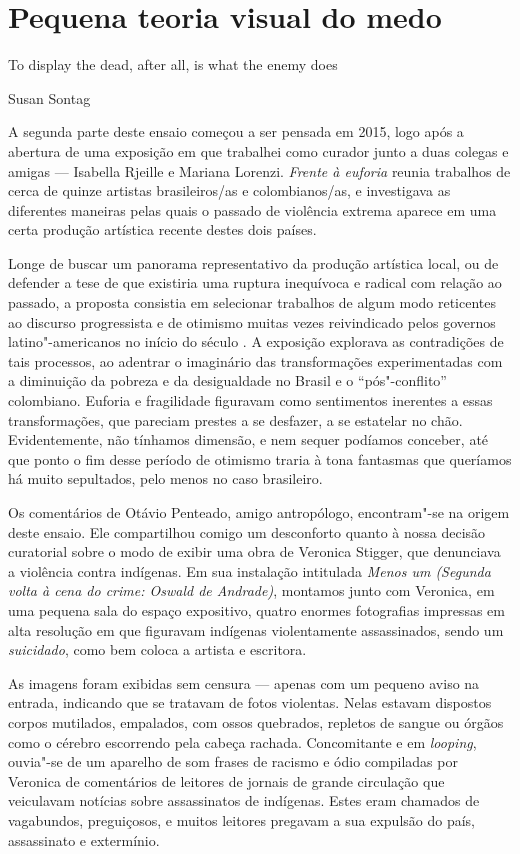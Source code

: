 \pagebreak

\section*{Pequena teoria visual do medo}

\epigraph{To display the dead, after all, is what the enemy does}{Susan Sontag}

A segunda parte deste ensaio começou a ser pensada em 2015, logo após a
abertura de uma exposição em que trabalhei como curador junto a duas
colegas e amigas --- Isabella Rjeille e Mariana Lorenzi. \emph{Frente à
euforia} reunia trabalhos de cerca de quinze artistas brasileiros/as e
colombianos/as, e investigava as diferentes maneiras pelas
quais o passado de violência extrema aparece em uma certa produção artística
recente destes dois países.

Longe de buscar um panorama representativo da produção artística local,
ou de defender a tese de que existiria uma ruptura inequívoca e radical
com relação ao passado, a proposta consistia em selecionar trabalhos de
algum modo reticentes ao discurso progressista e de otimismo muitas
vezes reivindicado pelos governos latino"-americanos no início do século
. A exposição explorava as contradições de tais processos, ao adentrar
o imaginário das transformações experimentadas com a diminuição da
pobreza e da desigualdade no Brasil e o ``pós"-conflito'' colombiano.
Euforia e fragilidade figuravam como sentimentos inerentes a essas
transformações, que pareciam prestes a se desfazer, a se estatelar no
chão. Evidentemente, não tínhamos dimensão, e nem sequer podíamos
conceber, até que ponto o fim desse período de otimismo traria à tona
fantasmas que queríamos há muito sepultados, pelo menos no caso
brasileiro.

Os comentários de Otávio Penteado, amigo antropólogo, encontram"-se na origem deste ensaio. Ele compartilhou comigo um desconforto quanto à nossa decisão
curatorial sobre o modo de exibir uma obra de Veronica Stigger, que denunciava a violência contra indígenas. Em sua instalação intitulada \emph{Menos um (Segunda
volta à cena do crime: Oswald de Andrade)}, montamos junto com Veronica,
em uma pequena sala do espaço expositivo, quatro enormes fotografias
impressas em alta resolução em que figuravam indígenas
violentamente assassinados, sendo um \emph{suicidado}, como bem coloca a
artista e escritora.

As imagens foram exibidas sem censura --- apenas com um pequeno aviso na
entrada, indicando que se tratavam de fotos violentas. Nelas estavam
dispostos corpos mutilados, empalados, com ossos quebrados, repletos de
sangue ou órgãos como o cérebro escorrendo pela cabeça rachada.
Concomitante e em \emph{looping}, ouvia"-se de um aparelho de som frases
de racismo e ódio compiladas por Veronica de comentários de leitores de
jornais de grande circulação que veiculavam notícias sobre assassinatos
de indígenas. Estes eram chamados de vagabundos, preguiçosos, e muitos
leitores pregavam a sua expulsão do país, assassinato e extermínio.

